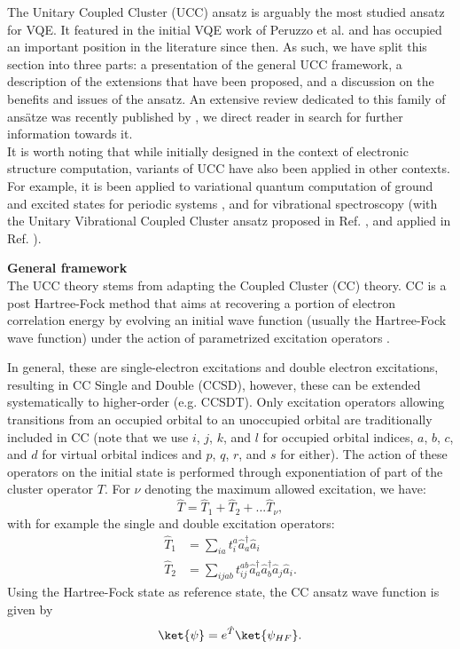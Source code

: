 The Unitary Coupled Cluster (UCC) ansatz is arguably the most studied ansatz for VQE. It featured in the initial VQE work of Peruzzo et al. \cite{Peruzzo2014} and has occupied an important position in the literature since then. As such, we have split this section into three parts: a presentation of the general UCC framework, a description of the extensions that have been proposed, and a discussion on the benefits and issues of the ansatz. An extensive review dedicated to this family of ans{\"{a}}tze was recently published by \cite{Anand2021_review}, we direct reader in search for further information towards it.\\

It is worth noting that while initially designed in the context of electronic structure computation, variants of UCC have also been applied in other contexts. For example, it is been applied to variational quantum computation of ground and excited states for periodic systems \cite{Yoshioka2022, Manrique2020, Liu2020}, and for vibrational spectroscopy (with the Unitary Vibrational Coupled Cluster ansatz proposed in Ref. \cite{McArdle2019_vibra}, and applied in Ref. \cite{Ollitrault2020_vibrational}). 


\textbf{General framework} \\

The UCC theory \cite{Bartlett1989, Taube2006, Filip2020} stems from adapting the Coupled Cluster (CC) theory. CC is a post Hartree-Fock method that aims at recovering a portion of electron correlation energy by evolving an initial wave function (usually the Hartree-Fock wave function) under the action of parametrized excitation operators \cite{Coester1960, Cizek1966, Paldus1972, Paldus1977, Cizek1980, Bartlett2007}.

In general, these are single-electron excitations and double electron excitations, resulting in CC Single and Double (CCSD),  however, these can be extended systematically to higher-order (e.g. CCSDT). Only excitation operators allowing transitions from an occupied orbital to an unoccupied orbital are traditionally included in CC (note that we use $i$, $j$, $k$, and $l$ for occupied orbital indices, $a$, $b$, $c$, and $d$ for virtual orbital indices and $p$, $q$, $r$, and $s$ for either).
The action of these operators on the initial state is performed through exponentiation of part of the cluster operator $T$. For $\nu$ denoting the maximum allowed excitation, we have:
\begin{equation}
    \hat{T} = \hat{T}_1 + \hat{T}_2 + ... \hat{T}_{\nu},
\end{equation}
with for example the single and double excitation operators:
\begin{align}
\hat{T}_1 &= \sum_{ia} t_{i}^a\hat{a}^{\dagger}_a \hat{a}_i \label{eq:T_one_body} \\
\hat{T}_2 &= \sum_{ijab} t_{ij}^{ab}\hat{a}^{\dagger}_a \hat{a}^{\dagger}_b \hat{a}_j \hat{a}_i. \label{eq:T_two_body}
\end{align}
Using the Hartree-Fock state as reference state, the CC ansatz wave function is given by
\begin{equation}
\ket{\psi} = e^{\hat{T}} \ket{\psi_{HF}}.
\end{equation}


